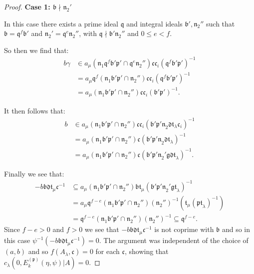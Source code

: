 \documentclass[a4paper,oneside]{amsart}
\theoremstyle{plain}
\theoremstyle{definition}
\begin{document}
\begin{proof}
\vspace{0.2in}
\textbf{Case 1: $\mathfrak{b}\nmid\mathfrak{n}_2'$}

\vspace{0.1in}
In this case there exists a prime ideal $\mathfrak{q}$ and integral ideals $\mathfrak{b'},\mathfrak{n}_2''$ such that $\mathfrak{b} = \mathfrak{q}^f\mathfrak{b'}$ and $\mathfrak{n}_2' = \mathfrak{q}^e\mathfrak{n}_2''$, with $\mathfrak{q}\nmid\mathfrak{b'}\mathfrak{n}_2''$ and $0\leq e < f$.

So then we find that: \begin{align*}b\gamma &\in a_{\mu}(\mathfrak{n}_1\mathfrak{q}^f\mathfrak{b'p'}\cap\mathfrak{q}^e\mathfrak{n}_2'')\mathfrak{cc}_i(\mathfrak{q}^f\mathfrak{b'p'})^{-1} \\ &= a_{\mu}\mathfrak{q}^f(\mathfrak{n}_1\mathfrak{b'p'}\cap\mathfrak{n}_2'')\mathfrak{cc}_i(\mathfrak{q}^f\mathfrak{b'p'})^{-1}\\ &=a_{\mu}(\mathfrak{n}_1\mathfrak{b'p'}\cap\mathfrak{n}_2'')\mathfrak{cc}_i(\mathfrak{b'p'})^{-1}.\end{align*}

It then follows that: \begin{align*} b &\in a_{\mu}(\mathfrak{n}_1\mathfrak{b'p'}\cap\mathfrak{n}_2'')\mathfrak{cc}_i(\mathfrak{b'p'n}_2\mathfrak{dt}_{\lambda}\mathfrak{c}_i)^{-1}\\ &=a_{\mu}(\mathfrak{n}_1\mathfrak{b'p'}\cap\mathfrak{n}_2'')\mathfrak{c}(\mathfrak{b'p'n}_2\mathfrak{dt}_{\lambda})^{-1}\\ &= a_{\mu}(\mathfrak{n}_1\mathfrak{b'p'}\cap\mathfrak{n}_2'')\mathfrak{c}(\mathfrak{b'p'n}_2'\mathfrak{gdt}_{\lambda})^{-1}.\end{align*}

Finally we see that: \begin{align*} -b\mathfrak{bdt}_{\mu}\mathfrak{c}^{-1} &\subseteq a_{\mu}(\mathfrak{n}_1\mathfrak{b'p'}\cap\mathfrak{n}_2'')\mathfrak{bt}_{\mu}(\mathfrak{b'p'n}_2'\mathfrak{gt}_{\lambda})^{-1}\\ &= a_{\mu}\mathfrak{q}^{f-e}(\mathfrak{n}_1\mathfrak{b'p'}\cap\mathfrak{n}_2'')(\mathfrak{n}_2'')^{-1}(\mathfrak{t}_{\mu}(\mathfrak{pt}_{\lambda})^{-1})\\ &=\mathfrak{q}^{f-e}(\mathfrak{n}_1\mathfrak{b'p'}\cap\mathfrak{n}_2'')(\mathfrak{n}_2'')^{-1} \subseteq \mathfrak{q}^{f-e}.\end{align*} Since $f-e>0$ and $f>0$ we see that $-b\mathfrak{bdt}_{\mu}\mathfrak{c}^{-1}$ is not coprime with $\mathfrak{b}$ and so in this case $\psi^{-1}(-b\mathfrak{bdt}_{\mu}\mathfrak{c}^{-1}) = 0$. The argument was independent of the choice of $(a,b)$ and so $f(A_{\lambda},\mathfrak{c}) = 0$ for each $\mathfrak{c}$, showing that $c_{\lambda}(0,E_k^{(\mathfrak{p})}(\eta,\psi)|A) = 0$.


\end{proof}
\end{document}
